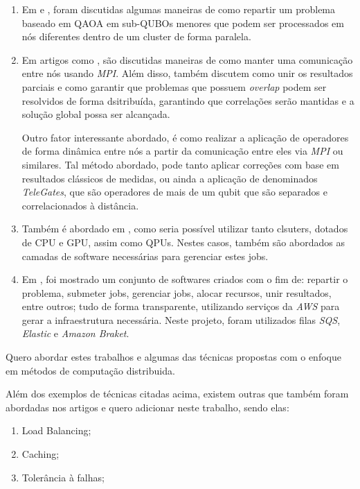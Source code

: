 \documentclass{paper}
\begin{document}
\begin{enumerate}
	\item Em \cite{GPU} e \cite{QuantumCentric}, foram discutidas algumas maneiras de como repartir um problema baseado em QAOA em sub-QUBOs menores que podem ser processados em nós diferentes dentro de um cluster de forma paralela.
	
	\item Em artigos como \cite{GPU,QuantumCentric,DistributedSimulator,EndToEnd}, são discutidas maneiras de como manter uma comunicação entre nós usando \textit{MPI}. Além disso, também discutem como unir os resultados parciais e como garantir que problemas que possuem \textit{overlap} podem ser resolvidos de forma dsitribuída, garantindo que correlações serão mantidas e a solução global possa ser alcançada.
	
	Outro fator interessante abordado, é como realizar a aplicação de operadores de forma dinâmica entre nós a partir da comunicação entre eles via \textit{MPI} ou similares. Tal método abordado, pode tanto aplicar correções com base em resultados clássicos de medidas, ou ainda a aplicação de denominados \textit{TeleGates}, que são operadores de mais de um qubit que são separados e correlacionados à distância.
	
	\item Também é abordado em \cite{GPU,DistributedSimulator,EndToEnd,Datacenters}, como seria possível utilizar tanto clsuters, dotados de CPU e GPU, assim como QPUs. Nestes casos, também são abordados as camadas de software necessárias para gerenciar estes jobs.
	
	\item Em \cite{Datacenters}, foi mostrado um conjunto de softwares criados com o fim de: repartir o problema, submeter jobs, gerenciar jobs, alocar recursos, unir resultados, entre outros; tudo de forma transparente, utilizando serviços da \textit{AWS} para gerar a infraestrutura necessária. Neste projeto, foram utilizados filas \textit{SQS}, \textit{Elastic} e \textit{Amazon Braket}.
	
\end{enumerate}

Quero abordar estes trabalhos e algumas das técnicas propostas com o enfoque em métodos de computação distribuida.

Além dos exemplos de técnicas citadas acima, existem outras que também foram abordadas nos artigos e quero adicionar neste trabalho, sendo elas:

\begin{enumerate}
	\item Load Balancing;
	\item Caching;
	\item Tolerância à falhas;
\end{enumerate}
\end{document}
